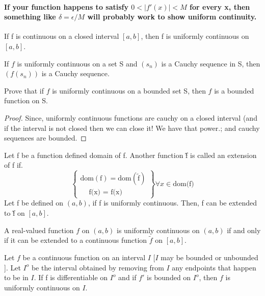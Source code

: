 \documentclass{notes}
\begin{document}
\paragraph{If your function happens to satisfy $ 0<|f'(x)|<M $ for every x, then something like $\delta=\epsilon/ M$  will probably work to show uniform continuity.}
\begin{theorem}{}
	If f is continuous on a closed interval $[a, b]$, then f is uniformly
	continuous on $[a, b]$.
\end{theorem}
\begin{theorem}{}
	If $f$ is uniformly continuous on a set S and $(s_n)$ is a Cauchy sequence
	in S, then $(f(s_n))$ is a Cauchy sequence.
\end{theorem}
\begin{problem}
	Prove that if $f$ is uniformly continuous on a bounded set S,
	then $f$ is a bounded function on S.
\end{problem}
\begin{proof}
	Since, uniformly continuous functions are cauchy on a closed interval (and if the interval is not closed then we can close it! We have that power.; and cauchy sequences are bounded.
\end{proof}
\begin{definition}{}
	Let f be a function defined domain of f. Another function \~{f} is called an extension of f if. 
	\[ 
	\left\{\begin{array}{lr}
	\mathrm{dom(f) = dom(\tilde{f})} \\
	\quad\ \text{f(x) = \~{f}(x)}
	\end{array}\right\}  \forall x \in \text{dom(f)}
	\]
	Let f be defined on $(a,b)$, if f is uniformly continuous. Then,  f can be extended to \~{f} on $[a,b]$.
	
\end{definition}
\begin{theorem}{}
	A real-valued function $f$ on $(a, b)$ is uniformly continuous on $(a, b)$
	if and only if it can be extended to a continuous function $\tilde{f}$ on $[a, b]$.
\end{theorem}
\begin{theorem}{}
	Let $f$ be a continuous function on an interval $I$ [$I$ may be bounded
	or unbounded ]. Let $I^o$ be the interval obtained by removing from $I$
	any endpoints that happen to be in $I$. If f is differentiable on $I^o$ and
	if $f'$ is bounded on $I^o$, then $f$ is uniformly continuous on $I$.
\end{theorem}
\end{document}

